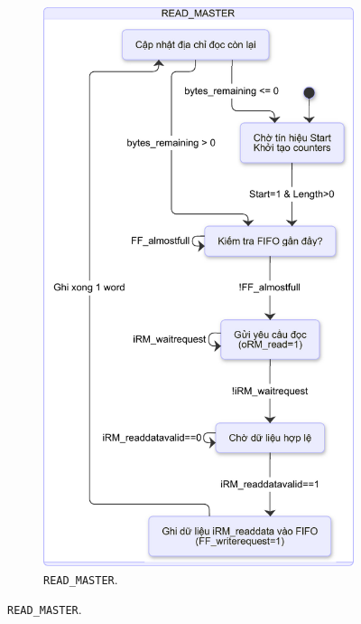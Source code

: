 \begin{figure}[htbp]
    \centering
    \begin{subfigure}[b]{0.49\textwidth}
        \centering
        \includegraphics[width=\linewidth]{Images/02_12_StateDiagram_ReadMaster.pdf}
        \caption{\texttt{READ\_MASTER}.}
        \label{fig:02_12_StateDiagram_ReadMaster}
    \end{subfigure}
    \hfill %

\end{figure}
